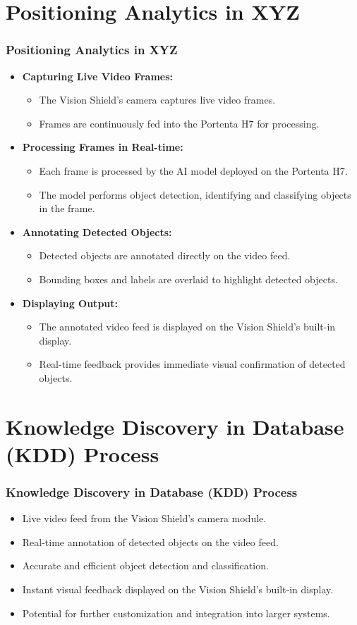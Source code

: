 \documentclass[10pt, a4paper]{beamer}
\begin{document}
	
	\section{Positioning Analytics in XYZ}
	\begin{frame}
		\frametitle{Positioning Analytics in XYZ}
		\begin{itemize}
			\item \textbf{Capturing Live Video Frames:}
			\begin{itemize}
				\item The Vision Shield's camera captures live video frames.
				\item Frames are continuously fed into the Portenta H7 for processing.
			\end{itemize}
			\item \textbf{Processing Frames in Real-time:}
			\begin{itemize}
				\item Each frame is processed by the AI model deployed on the Portenta H7.
				\item The model performs object detection, identifying and classifying objects in the frame.
			\end{itemize}
			\item \textbf{Annotating Detected Objects:}
			\begin{itemize}
				\item Detected objects are annotated directly on the video feed.
				\item Bounding boxes and labels are overlaid to highlight detected objects.
			\end{itemize}
			\item \textbf{Displaying Output:}
			\begin{itemize}
				\item The annotated video feed is displayed on the Vision Shield's built-in display.
				\item Real-time feedback provides immediate visual confirmation of detected objects.
			\end{itemize}
		\end{itemize}
	\end{frame}
	
	\section{Knowledge Discovery in Database (KDD) Process}
	\begin{frame}
		\frametitle{Knowledge Discovery in Database (KDD) Process}
		\begin{itemize}
			\item Live video feed from the Vision Shield's camera module.
			\item Real-time annotation of detected objects on the video feed.
			\item Accurate and efficient object detection and classification.
			\item Instant visual feedback displayed on the Vision Shield's built-in display.
			\item Potential for further customization and integration into larger systems.
		\end{itemize}
	\end{frame}
	
\end{document}

